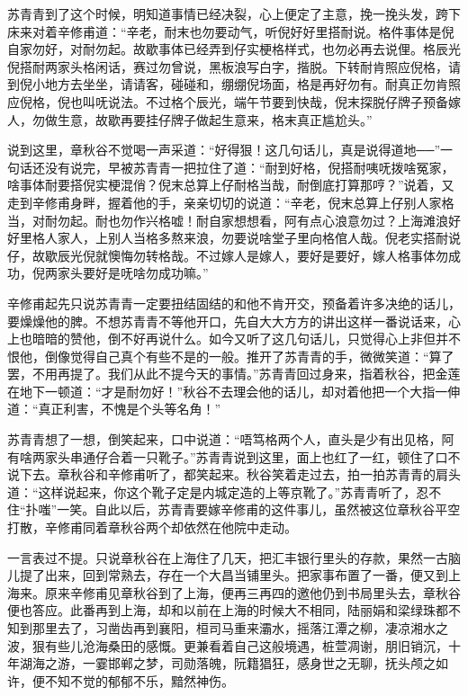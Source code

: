 \documentclass[12pt,UTF8]{ctexbook}
\begin{document}
{{{苏青青到了这个时候，明知道事情已经决裂，心上便定了主意，挽一挽头发，跨下床来对着辛修甫道：“辛老，耐末也勿要动气，听倪好好里搭耐说。格件事体是倪自家勿好，对耐勿起。故歇事体已经弄到仔实梗格样式，也勿必再去说俚。格辰光倪搭耐两家头格闲话，赛过勿曾说，黑板浪写白字，揩脱。下转耐肯照应倪格，请到倪小地方去坐坐，请请客，碰碰和，绷绷倪场面，格是再好勿有。耐真正勿肯照应倪格，倪也叫呒说法。不过格个辰光，端午节要到快哉，倪末探脱仔牌子预备嫁人，勿做生意，故歇再要挂仔牌子做起生意来，格末真正尴尬头。”

说到这里，章秋谷不觉喝一声采道：“好得狠！这几句话儿，真是说得道地──”一句话还没有说完，早被苏青青一把拉住了道：“耐到好格，倪搭耐咦呒拨啥冤家，啥事体耐要搭倪实梗混俏？倪末总算上仔耐格当哉，耐倒底打算那哼？”说着，又走到辛修甫身畔，握着他的手，亲亲切切的说道：“辛老，倪末总算上仔别人家格当，对耐勿起。耐也勿作兴格嘘！耐自家想想看，阿有点心浪意勿过？上海滩浪好好里格人家人，上别人当格多熬来浪，勿要说啥堂子里向格倌人哉。倪老实搭耐说仔，故歇辰光倪就懊悔勿转格哉。不过嫁人是嫁人，要好是要好，嫁人格事体勿成功，倪两家头要好是呒啥勿成功嘛。”

辛修甫起先只说苏青青一定要扭结固结的和他不肯开交，预备着许多决绝的话儿，要燥燥他的脾。不想苏青青不等他开口，先自大大方方的讲出这样一番说话来，心上也暗暗的赞他，倒不好再说什么。如今又听了这几句话儿，只觉得心上非但并不恨他，倒像觉得自己真个有些不是的一般。推开了苏青青的手，微微笑道：“算了罢，不用再提了。我们从此不提今天的事情。”苏青青回过身来，指着秋谷，把金莲在地下一顿道：“才是耐勿好！”秋谷不去理会他的话儿，却对着他把一个大指一伸道：“真正利害，不愧是个头等名角！”

苏青青想了一想，倒笑起来，口中说道：“唔笃格两个人，直头是少有出见格，阿有啥两家头串通仔合着一只靴子。”苏青青说到这里，面上也红了一红，顿住了口不说下去。章秋谷和辛修甫听了，都笑起来。秋谷笑着走过去，拍一拍苏青青的肩头道：“这样说起来，你这个靴子定是内城定造的上等京靴了。”苏青青听了，忍不住“扑嗤”一笑。自此以后，苏青青要嫁辛修甫的这件事儿，虽然被这位章秋谷平空打散，辛修甫同着章秋谷两个却依然在他院中走动。

一言表过不提。只说章秋谷在上海住了几天，把汇丰银行里头的存款，果然一古脑儿提了出来，回到常熟去，存在一个大昌当铺里头。把家事布置了一番，便又到上海来。原来辛修甫见章秋谷到了上海，便再三再四的邀他仍到书局里头去，章秋谷便也答应。此番再到上海，却和以前在上海的时候大不相同，陆丽娟和梁绿珠都不知到那里去了，习凿齿再到襄阳，桓司马重来灞水，摇落江潭之柳，凄凉湘水之波，狠有些儿沧海桑田的感慨。更兼看着自己这般境遇，桩萱凋谢，朋旧销沉，十年湖海之游，一霎邯郸之梦，司勋落魄，阮籍猖狂，感身世之无聊，抚头颅之如许，便不知不觉的郁郁不乐，黯然神伤。

}}}
\end{document}
